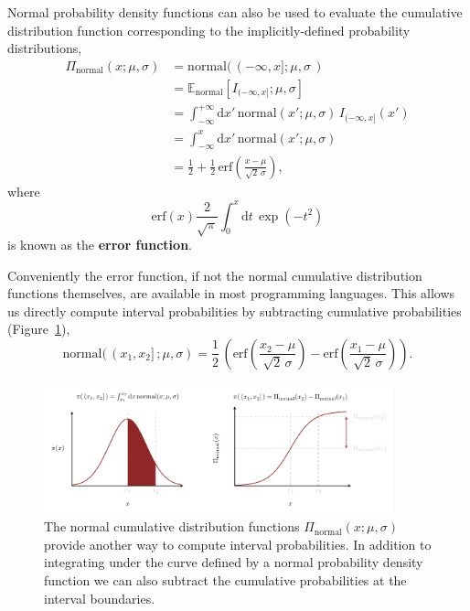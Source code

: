 \documentclass[
  letterpaper,
  DIV=11,
  numbers=noendperiod]{scrartcl}
\begin{document}
Normal probability density functions can also be used to evaluate the
cumulative distribution function corresponding to the implicitly-defined
probability distributions, \begin{align*}
\Pi_{\text{normal}}(x; \mu, \sigma)
&=
\text{normal}( \, (-\infty, x]; \mu, \sigma \, )
\\
&=
\mathbb{E}_{\mathrm{normal}}[ I_{(-\infty, x]}; \mu, \sigma ]
\\
&=
\int_{-\infty}^{+\infty} \mathrm{d} x' \,
\mathrm{normal}(x'; \mu, \sigma) \, I_{(-\infty, x]}(x')
\\
&=
\int_{-\infty}^{x} \mathrm{d} x' \,
\mathrm{normal}(x'; \mu, \sigma)
\\
&=
\frac{1}{2}
+
\frac{1}{2} \,
\mathrm{erf} \left( \frac{x - \mu}{\sqrt{2} \, \sigma} \right),
\end{align*} where \[
\mathrm{erf} (x)
\frac{2}{\sqrt{\pi}}
\int_{0}^{ x } \mathrm{d} t \, \exp \left( -t^{2} \right)
\] is known as the \textbf{error function}.

Conveniently the error function, if not the normal cumulative
distribution functions themselves, are available in most programming
languages. This allows us directly compute interval probabilities by
subtracting cumulative probabilities
(Figure~\ref{fig-normal-interval-prob}), \[
\text{normal}( \, (x_{1}, x_{2} ] \, ; \mu, \sigma )
=
\frac{1}{2} \, \left(
  \mathrm{erf} \left( \frac{x_{2} - \mu}{\sqrt{2} \, \sigma} \right)
- \mathrm{erf} \left( \frac{x_{1} - \mu}{\sqrt{2} \, \sigma} \right)
\right).
\]

\begin{figure}

{\centering \includegraphics[width=0.9\textwidth,height=\textheight]{figures/normal/interval_prob/interval_prob.pdf}

}

\caption{\label{fig-normal-interval-prob}The normal cumulative
distribution functions \(\Pi_{\text{normal}}(x; \mu, \sigma)\) provide
another way to compute interval probabilities. In addition to
integrating under the curve defined by a normal probability density
function we can also subtract the cumulative probabilities at the
interval boundaries.}

\end{figure}
\end{document}
